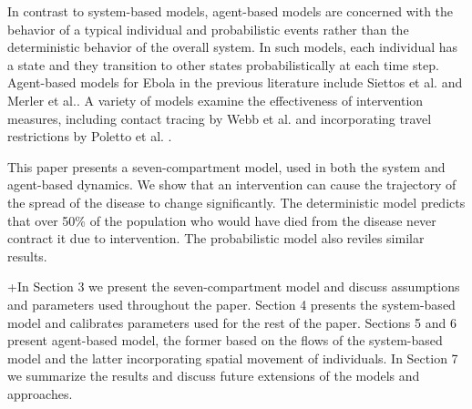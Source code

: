 In contrast to system-based models, agent-based models are concerned with the behavior of a typical individual and probabilistic events rather than the deterministic behavior of the overall system. In such models, each individual has a state and they transition to other states probabilistically at each time step. Agent-based models for Ebola in the previous literature include Siettos et al. \cite{Siettos2015} and Merler et al.\cite{Merler2015}. A variety of models examine the effectiveness of intervention measures, including contact tracing by Webb et al. \cite{Webb2015} and incorporating travel restrictions by Poletto et al. \cite{Poletto2014}.

This paper presents a seven-compartment model, used in both the system and agent-based dynamics. We show that an intervention can cause the trajectory of the spread of the disease to change significantly. The deterministic model predicts that over 50\% of the population who would have died from the disease never contract it due to intervention. The probabilistic model also reviles similar results. 

+In Section 3 we present the seven-compartment model and discuss assumptions and parameters used throughout the paper. Section 4 presents the system-based model and calibrates parameters used for the rest of the paper. Sections 5 and 6 present agent-based model, the former based on the flows of the system-based model and the latter incorporating spatial movement of individuals. In Section 7  we summarize the results and discuss future extensions of the models and approaches.  
